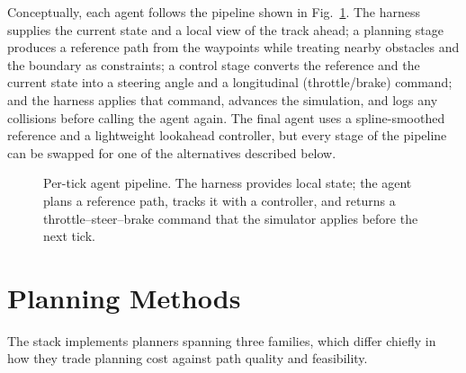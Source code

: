 \documentclass[conference]{IEEEtran}
\begin{document}
Conceptually, each agent follows the pipeline shown in
Fig.~\ref{fig:pipeline}. The harness supplies the current state and a local
view of the track ahead; a planning stage produces a reference path from the
waypoints while treating nearby obstacles and the boundary as constraints; a
control stage converts the reference and the current state into a steering
angle and a longitudinal (throttle/brake) command; and the harness applies that
command, advances the simulation, and logs any collisions before calling the
agent again. The final agent uses a spline-smoothed reference and a lightweight
lookahead controller, but every stage of the pipeline can be swapped for one of
the alternatives described below.

\begin{figure}[t]
\centering
{}
\caption{Per-tick agent pipeline. The harness provides local state; the agent
plans a reference path, tracks it with a controller, and returns a
throttle--steer--brake command that the simulator applies before the next tick.}
\label{fig:pipeline}
\end{figure}

\section{Planning Methods}

The stack implements planners spanning three families, which differ chiefly in
how they trade planning cost against path quality and feasibility.
\end{document}
